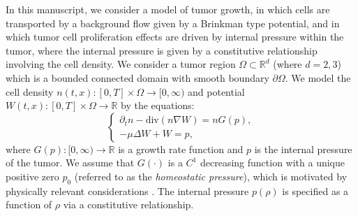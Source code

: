 \documentclass[12pt]{article}
\def\R{{\mathbb R}}
\theoremstyle{plain}
\begin{document}
In this manuscript, we consider a model of tumor growth, in which cells are transported by a background flow given by a Brinkman type potential, and in which tumor cell proliferation effects are driven by internal pressure within the tumor, where the internal pressure is given by a constitutive relationship involving the cell density. We consider a tumor region $\Omega \subset \R^{d}$ (where $d = 2, 3$) which is a bounded connected domain with smooth boundary $\partial \Omega$. We model the cell density $n(t, x): [0, T] \times \Omega \to [0, \infty)$ and potential $W(t, x): [0, T] \times \Omega \to \R$ by the equations:
\begin{equation*}
\begin{cases}
    \partial_{t}n - \text{div}(n\nabla W) = nG(p), \\
    -\mu \Delta W + W = p,
\end{cases}
\end{equation*}
where $G(p): [0, \infty) \to \R$ is a growth rate function and $p$ is the internal pressure of the tumor. We assume that $G(\cdot)$ is a $C^{1}$ decreasing function with a unique positive zero $p_{0}$ (referred to as the \textit{homeostatic pressure}), which is motivated by physically relevant considerations \cite{Tumor1, Tumor2}. The internal pressure $p(\rho)$ is specified as a function of $\rho$ via a constitutive relationship.
\end{document}
